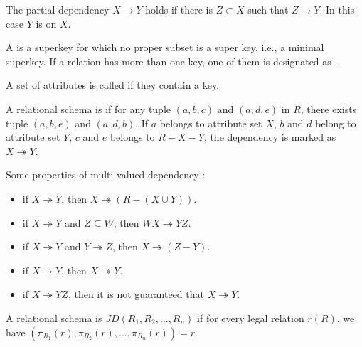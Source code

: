 \begin{definition}
    The partial dependency $X \rightarrow Y$ holds if there is $Z \subset X$ such that $Z \rightarrow Y$. In this case $Y$ is  on $X$.
\end{definition}

\begin{definition}[Key]
    A  is a superkey for which no proper subset is a super key, i.e., a minimal superkey. If a relation has more than one key, one of them is designated as .
\end{definition}

\begin{definition}[Superkey]
    A set of attributes is called  if they contain a key.
\end{definition}

\begin{definition}
    A relational schema is  \cite{Fagin1977} if for any tuple $(a,b,c)$ and $(a,d,e)$ in $R$, there exists tuple $(a,b,e)$ and $(a,d,b)$. If $a$ belongs to attribute set $X$, $b$ and $d$ belong to attribute set $Y$, $c$ and $e$ belongs to $R - X - Y$, the dependency is marked as $X \twoheadrightarrow Y$.
\end{definition}


\begin{theorem}
    Some properties of multi-valued dependency \cite{Beeri1977}:
    \begin{itemize}
        \item if $X \twoheadrightarrow Y$, then  $X \twoheadrightarrow \left(R - (X \cup Y) \right)$.
        \item if $X \twoheadrightarrow Y$ and $Z \subseteq W$, then  $WX \twoheadrightarrow YZ$.
        \item if $X \twoheadrightarrow Y$ and  $Y \twoheadrightarrow Z$, then  $X \twoheadrightarrow (Z - Y)$.
        \item if $X \rightarrow Y$, then $X \twoheadrightarrow Y$.
        \item if $X \twoheadrightarrow YZ$, then it is not guaranteed that $X \twoheadrightarrow Y$.
    \end{itemize}    
\end{theorem}


\begin{definition}
    A relational schema is  $JD(R_1, R_2, \dots, R_n)$ if for every legal relation $r(R)$, we have $\left(\pi_{R_1} (r), \pi_{R_2}(r), \dots, \pi_{R_n}(r) \right) = r$.
\end{definition}

